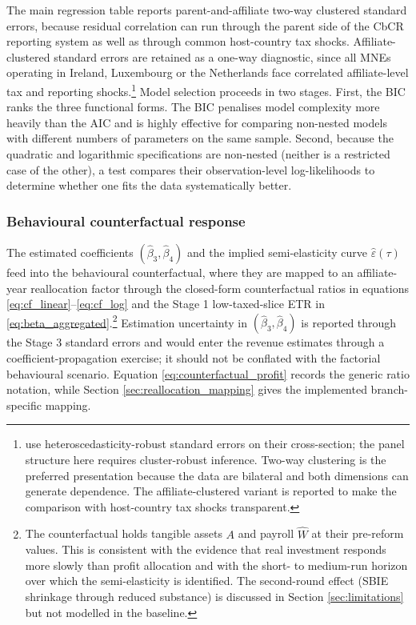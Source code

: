 \documentclass[11pt,a4paper]{article}
\begin{document}
The main regression table reports parent-and-affiliate two-way clustered standard errors, because residual correlation can run through the parent side of the CbCR reporting system as well as through common host-country tax shocks. Affiliate-clustered standard errors are retained as a one-way diagnostic, since all MNEs operating in Ireland, Luxembourg or the Netherlands face correlated affiliate-level tax and reporting shocks.\footnote{\citet{garcia-bernardo2024} use heteroscedasticity-robust standard errors on their cross-section; the panel structure here requires cluster-robust inference. Two-way clustering is the preferred presentation because the data are bilateral and both dimensions can generate dependence. The affiliate-clustered variant is reported to make the comparison with host-country tax shocks transparent.} Model selection proceeds in two stages. First, the BIC ranks the three functional forms. The BIC penalises model complexity more heavily than the AIC and is highly effective for comparing non-nested models with different numbers of parameters on the same sample. Second, because the quadratic and logarithmic specifications are non-nested (neither is a restricted case of the other), a \citet{vuong1989} test compares their observation-level log-likelihoods to determine whether one fits the data systematically better.

\subsubsection{Behavioural counterfactual response}\label{sec:counterfactual}

The estimated coefficients $(\hat{\beta}_3, \hat{\beta}_4)$ and the implied semi-elasticity curve $\hat{\varepsilon}(\tau)$ feed into the behavioural counterfactual, where they are mapped to an affiliate-year reallocation factor through the closed-form counterfactual ratios in equations \eqref{eq:cf_linear}--\eqref{eq:cf_log} and the Stage 1 low-taxed-slice ETR in \eqref{eq:beta_aggregated}.\footnote{The counterfactual holds tangible assets $A$ and payroll $\hat{W}$ at their pre-reform values. This is consistent with the evidence that real investment responds more slowly than profit allocation \citep{suarezserrato2018} and with the short- to medium-run horizon over which the semi-elasticity is identified. The second-round effect (SBIE shrinkage through reduced substance) is discussed in Section \ref{sec:limitations} but not modelled in the baseline.} Estimation uncertainty in $(\hat{\beta}_3, \hat{\beta}_4)$ is reported through the Stage 3 standard errors and would enter the revenue estimates through a coefficient-propagation exercise; it should not be conflated with the factorial behavioural scenario. Equation \eqref{eq:counterfactual_profit} records the generic ratio notation, while Section \ref{sec:reallocation_mapping} gives the implemented branch-specific mapping.
\end{document}
